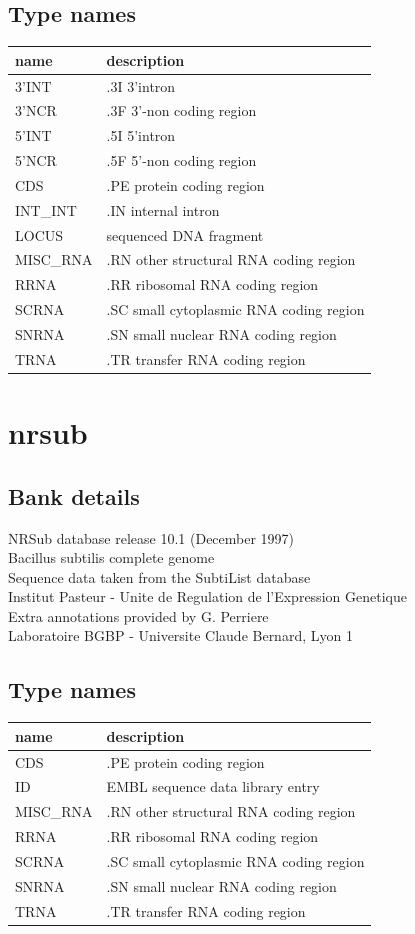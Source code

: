 \documentclass{article}
\begin{document}
\begin{Schunk}
\subsection{Type names}
\noindent\begin{tabular}{ll}
\hline \hline
name & description\\
\hline
3'INT & .3I 3'intron \\
3'NCR & .3F  3'-non coding region \\
5'INT & .5I 5'intron \\
5'NCR & .5F  5'-non coding region \\
CDS & .PE protein coding region \\
INT\_INT & .IN  internal intron \\
LOCUS & sequenced DNA fragment \\
MISC\_RNA & .RN other structural RNA coding region \\
RRNA & .RR ribosomal RNA coding region \\
SCRNA & .SC small cytoplasmic RNA coding region \\
SNRNA & .SN small nuclear RNA coding region \\
TRNA & .TR transfer RNA coding region \\
\hline \hline
\end{tabular}

\section{ nrsub }
\subsection{Bank details}
NRSub database release 10.1 (December 1997)\\
Bacillus subtilis complete genome\\
Sequence data taken from the SubtiList database\\
Institut Pasteur - Unite de Regulation de l'Expression Genetique\\
Extra annotations provided by G. Perriere\\
Laboratoire BGBP - Universite Claude Bernard, Lyon 1

\subsection{Type names}
\noindent\begin{tabular}{ll}
\hline \hline
name & description\\
\hline
CDS & .PE protein coding region \\
ID & EMBL sequence data library entry \\
MISC\_RNA & .RN other structural RNA coding region \\
RRNA & .RR ribosomal RNA coding region \\
SCRNA & .SC small cytoplasmic RNA coding region \\
SNRNA & .SN small nuclear RNA coding region \\
TRNA & .TR transfer RNA coding region \\
\hline \hline
\end{tabular}


\end{Schunk}
\end{document}
